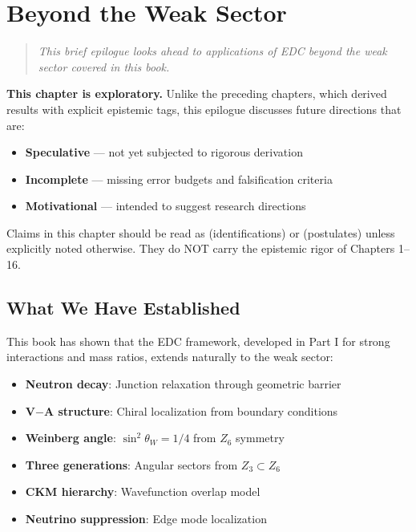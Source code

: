 \chapter{Beyond the Weak Sector}
\label{ch:beyond}

\begin{quote}
\textit{This brief epilogue looks ahead to applications of EDC beyond
the weak sector covered in this book.}
\end{quote}

\begin{tcolorbox}[colback=yellow!5!white, colframe=orange!50!black,
    title=\textbf{Epistemic Warning}]
\textbf{This chapter is exploratory.} Unlike the preceding chapters, which
derived results with explicit epistemic tags, this epilogue discusses future
directions that are:
\begin{itemize}[nosep]
    \item \textbf{Speculative} --- not yet subjected to rigorous derivation
    \item \textbf{Incomplete} --- missing error budgets and falsification criteria
    \item \textbf{Motivational} --- intended to suggest research directions
\end{itemize}
Claims in this chapter should be read as \tagI{} (identifications) or \tagP{}
(postulates) unless explicitly noted otherwise. They do NOT carry the epistemic
rigor of Chapters 1--16.
\end{tcolorbox}

\section{What We Have Established}

This book has shown that the EDC framework, developed in Part I for
strong interactions and mass ratios, extends naturally to the weak sector:

\begin{itemize}[nosep]
\item \textbf{Neutron decay}: Junction relaxation through geometric barrier \tagDc{}
\item \textbf{V$-$A structure}: Chiral localization from boundary conditions \tagDc{}
\item \textbf{Weinberg angle}: $\sin^2\theta_W = 1/4$ from $Z_6$ symmetry \tagDc{}
\item \textbf{Three generations}: Angular sectors from $Z_3 \subset Z_6$ \tagDc{}
\item \textbf{CKM hierarchy}: Wavefunction overlap model \tagDc{}
\item \textbf{Neutrino suppression}: Edge mode localization \tagDc{}
\end{itemize}


